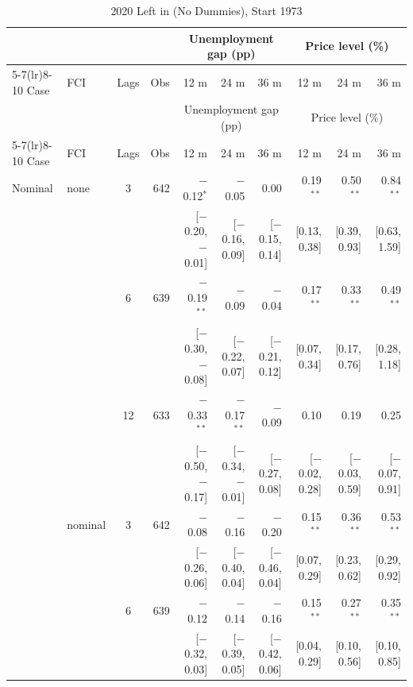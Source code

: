 \begingroup\scriptsize\setlength{\tabcolsep}{0.9pt}
\begin{longtable}{llcrrrrrrr}
\caption{2020 Left in (No Dummies), Start 1973}\label{tab:appR1a73}\\
\toprule
 & & & & \multicolumn{3}{c}{Unemployment gap (pp)} & \multicolumn{3}{c}{Price level (\%)}\\ \cmidrule(lr){5-7}\cmidrule(lr){8-10}
Case & FCI & Lags & Obs & 12 m & 24 m & 36 m & 12 m & 24 m & 36 m\\
\midrule\endfirsthead
\toprule
 & & & & \multicolumn{3}{c}{Unemployment gap (pp)} & \multicolumn{3}{c}{Price level (\%)}\\ \cmidrule(lr){5-7}\cmidrule(lr){8-10}
Case & FCI & Lags & Obs & 12 m & 24 m & 36 m & 12 m & 24 m & 36 m\\
\midrule\endhead
\bottomrule\endfoot
Nominal & none & 3 & 642 & $-$0.12$^{*}$ & $-$0.05 & 0.00 & 0.19$^{**}$ & 0.50$^{**}$ & 0.84$^{**}$\\
 & & & & {\scriptsize [$-$0.20, $-$0.01]} & {\scriptsize [$-$0.16, 0.09]} & {\scriptsize [$-$0.15, 0.14]} & {\scriptsize [0.13, 0.38]} & {\scriptsize [0.39, 0.93]} & {\scriptsize [0.63, 1.59]}\\
 &  & 6 & 639 & $-$0.19$^{**}$ & $-$0.09 & $-$0.04 & 0.17$^{**}$ & 0.33$^{**}$ & 0.49$^{**}$\\
 & & & & {\scriptsize [$-$0.30, $-$0.08]} & {\scriptsize [$-$0.22, 0.07]} & {\scriptsize [$-$0.21, 0.12]} & {\scriptsize [0.07, 0.34]} & {\scriptsize [0.17, 0.76]} & {\scriptsize [0.28, 1.18]}\\
 &  & 12 & 633 & $-$0.33$^{**}$ & $-$0.17$^{**}$ & $-$0.09 & 0.10 & 0.19 & 0.25\\
 & & & & {\scriptsize [$-$0.50, $-$0.17]} & {\scriptsize [$-$0.34, $-$0.01]} & {\scriptsize [$-$0.27, 0.08]} & {\scriptsize [$-$0.02, 0.28]} & {\scriptsize [$-$0.03, 0.59]} & {\scriptsize [$-$0.07, 0.91]}\\
 & nominal & 3 & 642 & $-$0.08 & $-$0.16 & $-$0.20 & 0.15$^{**}$ & 0.36$^{**}$ & 0.53$^{**}$\\
 & & & & {\scriptsize [$-$0.26, 0.06]} & {\scriptsize [$-$0.40, 0.04]} & {\scriptsize [$-$0.46, 0.04]} & {\scriptsize [0.07, 0.29]} & {\scriptsize [0.23, 0.62]} & {\scriptsize [0.29, 0.92]}\\
 &  & 6 & 639 & $-$0.12 & $-$0.14 & $-$0.16 & 0.15$^{**}$ & 0.27$^{**}$ & 0.35$^{**}$\\
 & & & & {\scriptsize [$-$0.32, 0.03]} & {\scriptsize [$-$0.39, 0.05]} & {\scriptsize [$-$0.42, 0.06]} & {\scriptsize [0.04, 0.29]} & {\scriptsize [0.10, 0.56]} & {\scriptsize [0.10, 0.85]}\\

\end{longtable}
